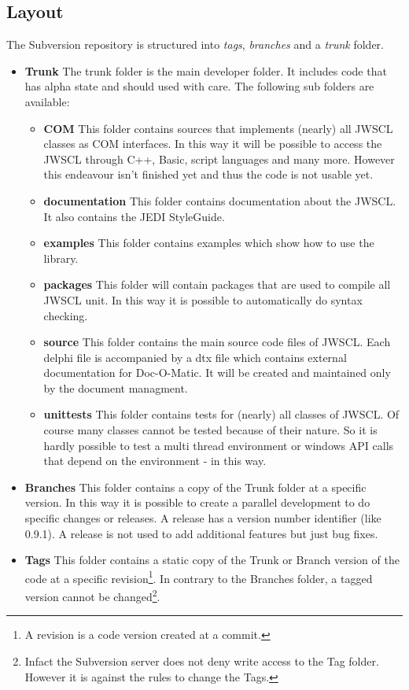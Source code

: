 \documentclass[a4paper,twoside,10pt]{report}
\begin{document}
\subsection{Layout}
The Subversion repository is structured into \textit{tags}, \textit{branches} and a \textit{trunk} folder.
\begin{itemize}
	\item \textbf{Trunk} The trunk folder is the main developer folder. It includes code that has alpha state and should used with care. The following sub folders are available:
	  
		\begin{itemize}
			\item \textbf{COM} This folder contains sources that implements (nearly) all JWSCL classes as COM interfaces. In this way it will be possible to access the JWSCL through C++, Basic, script languages and many more. However this endeavour isn't finished yet and thus the code is not usable yet.
			\item \textbf{documentation} This folder contains documentation about the JWSCL. It also contains the JEDI StyleGuide.
			\item \textbf{examples} This folder contains examples which show how to use the library. 
			\item \textbf{packages} This folder will contain packages that are used to compile all JWSCL unit. In this way it is possible to automatically do syntax checking.
			\item \textbf{source} This folder contains the main source code files of JWSCL. Each delphi file is accompanied by a dtx file which contains external documentation for Doc-O-Matic. It will be created and maintained only by the document managment.
			\item \textbf{unittests} This folder contains tests for (nearly) all classes of JWSCL. Of course many classes cannot be tested because of their nature. So it is hardly possible to test a multi thread environment or windows API calls that depend on the environment - in this way.
		\end{itemize}
	\item \textbf{Branches} This folder contains a copy of the Trunk folder at a specific version. In this way it is possible to create a parallel development to do specific changes or releases. A release has a version number identifier (like 0.9.1). A release is not used to add additional features but just bug fixes. 
	\item \textbf{Tags} This folder contains a static copy of the Trunk or Branch version of the code at a specific revision\footnote{A revision is a code version created at a commit.}. In contrary to the Branches folder, a tagged version cannot be changed\footnote{Infact the Subversion server does not deny write access to the Tag folder. However it is against the rules to change the Tags.}. 
\end{itemize}
\end{document}

